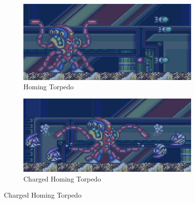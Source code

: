 \begin{figure}[htp]
	\centering
	\begin{subfigure}{0.48\textwidth}
		\centering
		\includegraphics[width=\linewidth]{figures/X1/Launch_octopus/Octopus_missile.jpg}
		\caption{Homing Torpedo}
	\end{subfigure}
	\begin{subfigure}{0.49\textwidth}
		\centering
		\includegraphics[width=\linewidth]{figures/X1/Launch_octopus/Octopus_piranha.jpg}
		\caption{Charged Homing Torpedo}
	\end{subfigure}
\end{figure}

